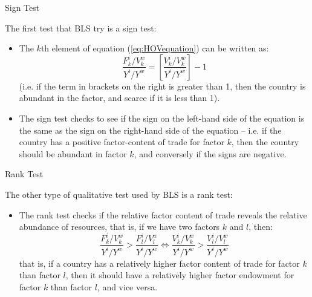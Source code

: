 \documentclass[aspectratio=169]{beamer}
\begin{document}

\begin{frame}{Sign Test}

The first test that BLS try is a sign test:

\begin{itemize}
    \item<1-> The $ k $th element of equation (\ref{eq:HOVequation}) can be written as:
    \begin{equation*}
        \frac{F_{k}^{i} / V_{k}^{w}}{Y^{i} / Y^{w}} = \left[ \frac{V_{k}^{i} / V_{k}^{w}}{Y^{i} / Y^{w}} \right] - 1
    \end{equation*}
    (i.e. if the term in brackets on the right is greater than 1, then the country is abundant in the factor, and scarce if it is less than 1).
    \item<2-> The sign test checks to see if the sign on the left-hand side of the equation is the same as the sign on the right-hand side of the equation – i.e. if the country has a positive factor-content of trade for factor  $ k $, then the country should be abundant in factor $ k $, and conversely if the signs are negative.
\end{itemize}
    
\end{frame}


\begin{frame}{Rank Test}

The other type of qualitative test used by BLS is a rank test:

\begin{itemize}
    \item<1-> The rank test checks if the relative factor content of trade reveals the relative abundance of resources, that is, if we have two factors $ k $ and  $ l $, then:
    \begin{equation*}
        \frac{F_{k}^{i} / V_{k}^{w}}{Y^{i} / Y^{w}} > \frac{F_{l}^{i} / V_{l}^{w}}{Y^{i} / Y^{w}} \Leftrightarrow  \frac{V_{k}^{i} / V_{k}^{w}}{Y^{i} / Y^{w}} > \frac{V_{l}^{i} / V_{l}^{w}}{Y^{i} / Y^{w}}
    \end{equation*}
    that is, if a country has a relatively higher factor content of trade for factor $ k $ than factor $ l $, then it should have a relatively higher factor endowment for factor $ k $ than factor $ l $, and vice versa.
\end{itemize}
    
\end{frame}
\end{document}
